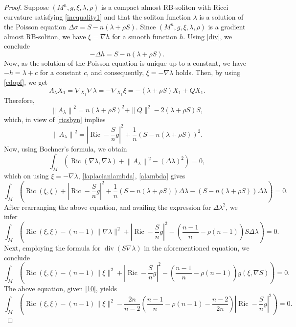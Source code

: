 \documentclass[a4paper, twoside, 10pt]{article}
\numberwithin{equation}{section}
\theoremstyle{definition}
\begin{document}
 \begin{proof}
Suppose $(M^n, g, \xi, \lambda,\rho)$ is a compact almost RB-soliton with Ricci curvature satisfying \eqref{inequality1}
and {that the soliton function $\lambda$ is a solution of the Poisson equation $\Delta \sigma=S-n (\lambda +\rho S)$.}
Since $(M^n, g, \xi, \lambda,\rho)$ is a gradient almost RB-soliton, we have $\xi=\nabla h$ for a smooth function $h$. Using  \eqref{div}, we conclude
\[
-\Delta h=S-n (\lambda +\rho S) .
\]
Now, as the solution of the Poisson equation is unique up to a constant, we have {$-h=\lambda+c$ }for a constant $c$, and consequently, $\xi=-\nabla \lambda$ holds. Then, by using
 \eqref{cdopf}, we get
\[
A_{\lambda} X_1=\nabla_{X_1} \nabla \lambda=-\nabla_{X_1} \xi=-(\lambda +\rho S) X_1+Q X_1.
\]
Therefore,
\[
\left\|A_{\lambda}\right\|^{2}=n (\lambda +\rho S)^{2}+\|Q\|^{2}-2 (\lambda +\rho S) S,
\]
which, in view of \eqref{ricsbyn} implies
\begin{equation}\label{alambda}
    \left\|A_{\lambda}\right\|^{2}=\left|\operatorname{Ric}-\frac{S}{n} g\right|^{2}+\frac{1}{n}(S-n (\lambda +\rho S))^{2} .
\end{equation}
Now,  using Bochner's formula, we obtain
$$
\int_{M}\left(\operatorname{Ric}(\nabla \lambda, \nabla \lambda)+\left\|A_{\lambda}\right\|^{2}-(\Delta \lambda)^{2}\right)=0,
$$
which on using $\xi=-\nabla \lambda$, \eqref{laplacianlambda}, \eqref{alambda} 
gives
$$
\int_{M}\left(\operatorname{Ric}(\xi, \xi)+\left|\operatorname{Ric}-\frac{S}{n} g\right|^{2}+\frac{1}{n}(S-n (\lambda +\rho S)) \Delta \lambda-(S-n (\lambda +\rho S)) \Delta \lambda\right)=0 .
$$
After rearranging the above equation,
and availing the expression for $\Delta\lambda^2$, we infer
\[
\int_{M}\left(\operatorname{Ric}(\xi, \xi)-(n-1)\|\nabla \lambda\|^{2}+\left|\operatorname{Ric}-\frac{S}{n} g\right|^{2}-\left(\frac{n-1}{n}-\rho(n-1)\right) S \Delta \lambda\right)=0 .
\]
Next, employing the formula for  $\operatorname{div}(S \nabla \lambda)$ in the aforementioned equation, we conclude
\[
\int_{M}\left(\operatorname{Ric}(\xi, \xi)-(n-1)\|\xi\|^{2}+\left|\operatorname{Ric}-\frac{S}{n} g\right|^{2}-\left(\frac{n-1}{n}-\rho(n-1)\right)  g(\xi, \nabla S)\right)=0.
\]
 The above equation, given \eqref{10}, yields
\[
\int_{M}\left(\operatorname{Ric}(\xi, \xi)-(n-1)\|\xi\|^{2}-\frac{2n}{n-2}\left(\frac{n-1}{n}-\rho(n-1)-\frac{n-2}{2n}\right) \left|\operatorname{Ric}-\frac{S}{n} g\right|^{2}\right)=0.
\]
\end{proof}
\end{document}
